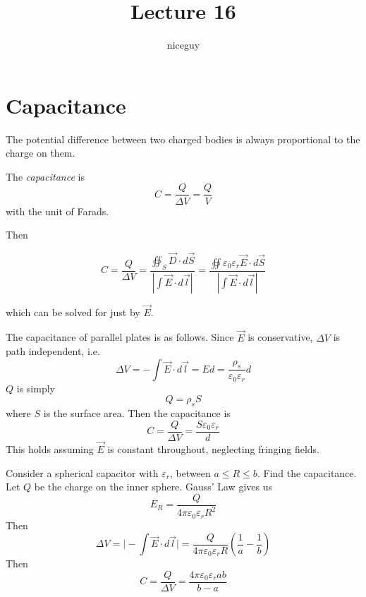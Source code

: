 \documentclass[12pt]{article}
\author{niceguy}
\title{Lecture 16}
\begin{document}
\maketitle

\section{Capacitance}

The potential difference between two charged bodies is always proportional to the charge on them.

\begin{defn}
	The \emph{capacitance} is
	$$C = \frac{Q}{\Delta V} = \frac{Q}{V}$$
	with the unit of Farads.
\end{defn}

Then

$$C = \frac{Q}{\Delta V} = \frac{\oiint_S \vec{D} \cdot d\vec{S}}{|\int\vec{E}\cdot d\vec{l}|} = \frac{\oiint\varepsilon_0\varepsilon_r\vec{E}\cdot d\vec{S}}{|\int\vec{E}\cdot d\vec{l}|}$$

which can be solved for just by $\vec{E}$.

\begin{ex}
	The capacitance of parallel plates is as follows. Since $\vec{E}$ is conservative, $\Delta V$ is path independent, i.e.
	$$\Delta V = -\int \vec{E} \cdot d\vec{l} = Ed = \frac{\rho_s}{\varepsilon_0\varepsilon_r}d$$
	$Q$ is simply
	$$Q = \rho_sS$$
	where $S$ is the surface area. Then the capacitance is
	$$C = \frac{Q}{\Delta V} = \frac{S\varepsilon_0\varepsilon_r}{d}$$
	This holds assuming $\vec{E}$ is constant throughout, neglecting fringing fields.
\end{ex}

\begin{ex}
	Consider a spherical capacitor with $\varepsilon_r$, between $a \leq R \leq b$. Find the capacitance. \\
	Let $Q$ be the charge on the inner sphere. Gauss' Law gives us
	$$E_R = \frac{Q}{4\pi\varepsilon_0\varepsilon_rR^2}$$
	Then
	$$\Delta V = \Big |-\int\vec{E}\cdot d\vec{l} \Big | = \frac{Q}{4\pi\varepsilon_0\varepsilon_rR}\left(\frac{1}{a}-\frac{1}{b}\right)$$
	Then
	$$C = \frac{Q}{\Delta V} = \frac{4\pi\varepsilon_0\varepsilon_rab}{b-a}$$
\end{ex}
\end{document}
